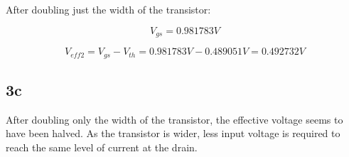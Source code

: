 \documentclass[12pt, letterpaper, notitlepage, DIV=16, BCOR=1mm, headlines=2]{scrreprt}
\begin{document}
After doubling just the width of the transistor:

$$
V_{gs} = 0.981783V 
$$

$$
	V_{eff2} = V_{gs} - V_{th} = 0.981783V -  0.489051V = 0.492732V
$$


\subsection*{3c}
After doubling only the width of the transistor, the effective voltage seems to have been halved.
As the transistor is wider, less input voltage is required to reach the same level of current at the drain.
\end{document}
